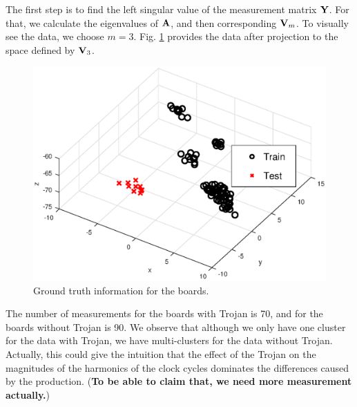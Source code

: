 \documentclass[journal]{IEEEtran}
\begin{document}
The first step is to find the left singular value of the measurement matrix ${\bf Y}$. For that, we calculate the eigenvalues of ${\bf A}$, and then corresponding ${\bf V}_m$.  To visually see the data, we choose $m=3$.  Fig. \ref{fig:groundTruth} provides the data after projection to the space defined by  ${\bf V}_3$. 

\begin{figure}[ht]
	\centering
	\includegraphics[trim=0.0in 0.0in 0.0in 0.0in,clip=true,width=\linewidth]{figure/originalGraph.eps}
	\caption{Ground truth information for the  boards.}
	\label{fig:groundTruth}
\end{figure}

The number of measurements for the boards with Trojan is  70, and for the boards without Trojan is 90. We observe that although we only have one cluster for the data with Trojan, we have multi-clusters for the data without Trojan. Actually, this could give the intuition that  the effect of the Trojan on the magnitudes of the harmonics of the clock cycles dominates the differences caused by                           the production. ({\bf To be able to claim that, we need more measurement actually.})
\end{document}
